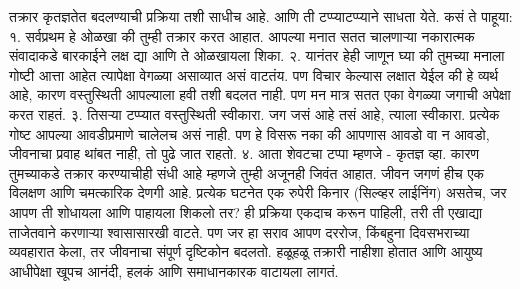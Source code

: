 तक्रार कृतज्ञतेत बदलण्याची प्रक्रिया तशी साधीच आहे. आणि ती टप्प्याटप्प्याने साधता येते. कसं ते पाहूया:
१. सर्वप्रथम हे ओळखा की तुम्ही तक्रार करत आहात. आपल्या मनात सतत चालणाऱ्या नकारात्मक संवादाकडे बारकाईने लक्ष द्या आणि ते ओळखायला शिका.
२. यानंतर हेही जाणून घ्या की तुमच्या मनाला गोष्टी आत्ता आहेत त्यापेक्षा वेगळ्या असाव्यात असं वाटतंय. पण विचार केल्यास लक्षात येईल की हे व्यर्थ आहे, कारण वस्तुस्थिती आपल्याला हवी तशी बदलत नाही. पण मन मात्र सतत एका वेगळ्या जगाची अपेक्षा करत राहतं.
३. तिसऱ्या टप्प्यात वस्तुस्थिती स्वीकारा. जग जसं आहे तसं आहे, त्याला स्वीकारा. प्रत्येक गोष्ट आपल्या आवडीप्रमाणे चालेलच असं नाही. पण हे विसरू नका की आपणास आवडो वा न आवडो, जीवनाचा प्रवाह थांबत नाही, तो पुढे जात राहतो.
४. आता शेवटचा टप्पा म्हणजे - कृतज्ञ व्हा. कारण तुमच्याकडे तक्रार करण्याचीही संधी आहे म्हणजे तुम्ही अजूनही जिवंत आहात. जीवन जगणं हीच एक विलक्षण आणि चमत्कारिक देणगी आहे. प्रत्येक घटनेत एक रुपेरी किनार (सिल्व्हर लाईनिंग) असतेच, जर आपण ती शोधायला आणि पाहायला शिकलो तर?
ही प्रक्रिया एकदाच करून पाहिली, तरी ती एखाद्या ताजेतवाने करणाऱ्या श्वासासारखी वाटते. पण जर हा सराव आपण दररोज, किंबहुना दिवसभराच्या व्यवहारात केला, तर जीवनाचा संपूर्ण दृष्टिकोन बदलतो. हळूहळू तक्रारी नाहीशा होतात आणि आयुष्य आधीपेक्षा खूपच आनंदी, हलकं आणि समाधानकारक वाटायला लागतं.
